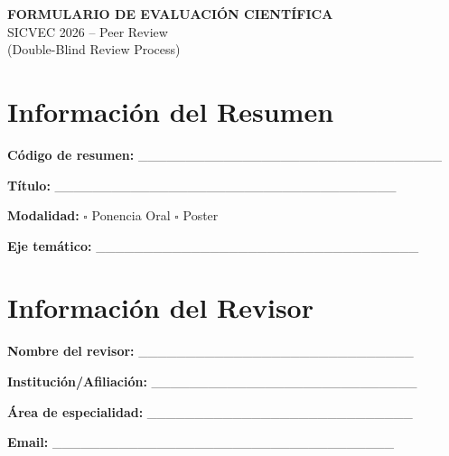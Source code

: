 \documentclass[12pt,a4paper]{article}
\begin{document}

\thispagestyle{empty}

\begin{center}
{\Large\bfseries\color{verdeosc} FORMULARIO DE EVALUACIÓN CIENTÍFICA}\\
{\normalsize\color{verdemid} SICVEC 2026 -- Peer Review}\\[0.5cm]
\small (Double-Blind Review Process)\\[1.5cm]
\end{center}

\section{Información del Resumen}

\noindent
\textbf{Código de resumen:} \_\_\_\_\_\_\_\_\_\_\_\_\_\_\_\_\_\_\_\_\_\_\_\_\_\_\_\_\_\_\_\_

\noindent
\textbf{Título:} \_\_\_\_\_\_\_\_\_\_\_\_\_\_\_\_\_\_\_\_\_\_\_\_\_\_\_\_\_\_\_\_\_\_\_\_

\noindent
\textbf{Modalidad:} \hspace{0.5cm} $\square$ Ponencia Oral \hspace{1cm} $\square$ Poster

\noindent
\textbf{Eje temático:} \_\_\_\_\_\_\_\_\_\_\_\_\_\_\_\_\_\_\_\_\_\_\_\_\_\_\_\_\_\_\_\_\_\_

\vspace{0.8cm}

\section{Información del Revisor}

\noindent
\textbf{Nombre del revisor:} \_\_\_\_\_\_\_\_\_\_\_\_\_\_\_\_\_\_\_\_\_\_\_\_\_\_\_\_\_

\noindent
\textbf{Institución/Afiliación:} \_\_\_\_\_\_\_\_\_\_\_\_\_\_\_\_\_\_\_\_\_\_\_\_\_\_\_\_

\noindent
\textbf{Área de especialidad:} \_\_\_\_\_\_\_\_\_\_\_\_\_\_\_\_\_\_\_\_\_\_\_\_\_\_\_\_

\noindent
\textbf{Email:} \_\_\_\_\_\_\_\_\_\_\_\_\_\_\_\_\_\_\_\_\_\_\_\_\_\_\_\_\_\_\_\_\_\_\_\_
\end{document}
